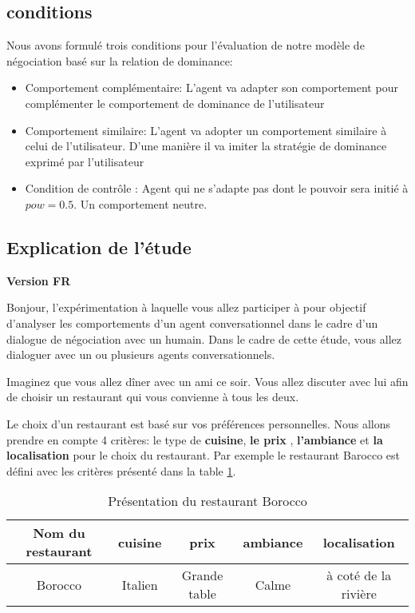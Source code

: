 \documentclass [french]{paper}
\begin{document}
		\subsection{conditions}
		
		Nous avons formulé trois conditions pour l'évaluation de notre modèle de négociation basé sur la relation de dominance: 
		\begin{itemize}
			\item Comportement complémentaire: L'agent va adapter son comportement pour complémenter le comportement de dominance de l'utilisateur
			
			\item Comportement similaire: L'agent va adopter un comportement similaire à celui de l'utilisateur. D'une manière il va imiter la stratégie de dominance exprimé par l'utilisateur
			
			\item Condition de contrôle : Agent qui ne s'adapte pas dont le pouvoir sera initié à $pow =0.5$. Un comportement neutre. 
			\end{itemize}
			
			
				\subsection{Explication de l'étude}
				\textbf{ Version FR}
				
				Bonjour, l’expérimentation à laquelle vous allez participer à pour objectif d'analyser les comportements d’un agent conversationnel dans le cadre d’un dialogue de négociation avec un humain.
				Dans le cadre de cette étude, vous allez dialoguer avec un ou plusieurs agents conversationnels.
				
				Imaginez que vous allez dîner avec un ami ce soir. Vous allez discuter avec lui afin de choisir un restaurant qui vous convienne à tous les deux.
				
				Le choix d'un restaurant est basé sur vos préférences personnelles. Nous allons prendre en compte 4 critères: le type de \textbf{cuisine}, \textbf{le prix} , \textbf{l'ambiance} et \textbf{la localisation} pour le choix du restaurant. Par exemple le restaurant Barocco est défini avec les critères présenté dans la table \ref{teb:exfr}.
				\begin{table}[h]
					\begin{tabular} {|c|c|c|c|c|}
						\hline
						Nom du restaurant & cuisine & prix & ambiance& localisation \\
						\hline
						Borocco & Italien & Grande table & Calme & à coté de la rivière \\
						\hline 
					\end{tabular}
					\label{teb:exfr}
					\caption{Présentation du restaurant Borocco}
				\end{table}
				
\end{document}
